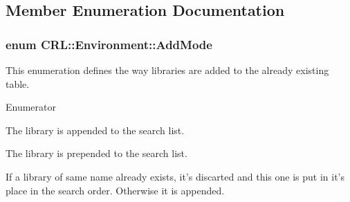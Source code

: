 \subsection{Member Enumeration Documentation}
\hypertarget{classCRL_1_1Environment_ac5692c2f5d20e892573a3d46de222aeb}{
\subsubsection[{Add\-Mode}]{\setlength{\rightskip}{0pt plus 5cm}enum {\bf C\-R\-L\-::\-Environment\-::\-Add\-Mode}}}\label{classCRL_1_1Environment_ac5692c2f5d20e892573a3d46de222aeb}
This enumeration defines the way libraries are added to the already existing table. \begin{Desc}
\item[Enumerator]\par
\begin{description}
\item[{\em 
\hypertarget{classCRL_1_1Environment_ac5692c2f5d20e892573a3d46de222aeba69ce578d2eeb6a8de507920ccf673b8d}{Append}\label{classCRL_1_1Environment_ac5692c2f5d20e892573a3d46de222aeba69ce578d2eeb6a8de507920ccf673b8d}
}]The library is appended to the search list. \item[{\em 
\hypertarget{classCRL_1_1Environment_ac5692c2f5d20e892573a3d46de222aeba9acc311bf991f5e62be5ea9333083fd0}{Prepend}\label{classCRL_1_1Environment_ac5692c2f5d20e892573a3d46de222aeba9acc311bf991f5e62be5ea9333083fd0}
}]The library is prepended to the search list. \item[{\em 
\hypertarget{classCRL_1_1Environment_ac5692c2f5d20e892573a3d46de222aeba61fc1f828e487ed148c456f3d37be83a}{Replace}\label{classCRL_1_1Environment_ac5692c2f5d20e892573a3d46de222aeba61fc1f828e487ed148c456f3d37be83a}
}]If a library of same name already exists, it's discarted and this one is put in it's place in the search order. Otherwise it is appended. \end{description}
\end{Desc}


